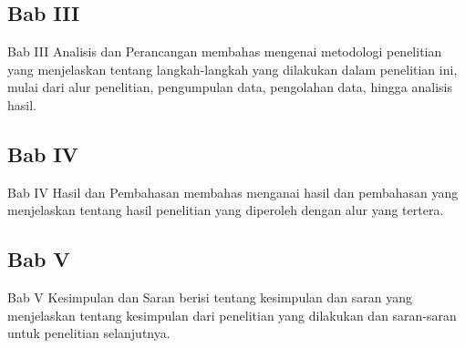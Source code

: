 \subsection{Bab III}
\indent Bab III Analisis dan Perancangan membahas mengenai metodologi penelitian yang menjelaskan tentang langkah-langkah yang dilakukan dalam penelitian ini, mulai dari alur penelitian, pengumpulan data, pengolahan data, hingga analisis hasil.
\subsection{Bab IV}
\indent Bab IV Hasil dan Pembahasan membahas menganai hasil dan pembahasan yang menjelaskan tentang hasil penelitian yang diperoleh dengan alur yang tertera. 
\subsection{Bab V}
\indent Bab V Kesimpulan dan Saran berisi tentang kesimpulan dan saran yang menjelaskan tentang kesimpulan dari penelitian yang dilakukan dan saran-saran untuk penelitian selanjutnya.
